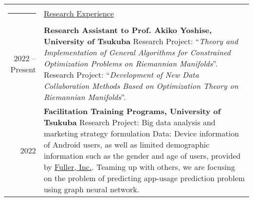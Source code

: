 \documentclass[letterpaper,11pt]{article}
\newcommand{\headingfont}{\LARGE \MakeUppercase }
\newenvironment{SectionTable}[1]{
	\renewcommand*{\arraystretch}{1.0}
	\setlength{\tabcolsep}{10pt}
	\begin{longtable}{Rp{5.2in}} 
		\rule{2.5cm}{4pt} 
		& \underline{#1} \\ %
	}
	{
	\end{longtable}\vspace{-.3cm}
}
\begin{document}
%	
%	
%	
%	
%	



\begin{SectionTable}{\headingfont Research Experience}
	2022 -- Present & 
	\textbf{Research Assistant to Prof. Akiko Yoshise, University of Tsukuba} \newline
	Research Project: ``\textit{Theory and Implementation of General Algorithms for Constrained Optimization Problems on Riemannian Manifolds}''. \newline
	Research Project: ``\textit{Development of New Data Collaboration Methods Based on Optimization Theory on Riemannian Manifolds}''. \\
	
	2022 &
	\textbf{Facilitation Training Programs, University of Tsukuba}
	\newline
	Research Project: Big data analysis and marketing strategy formulation
	\newline
	Data: Device information of Android users, as well as limited demographic information such as the gender and age of users, provided by \href{https://en.fuller-inc.com/}{Fuller, Inc.}. \newline
	Teaming up with others, we are focusing on the problem of predicting app-usage prediction problem using graph neural network.
\end{SectionTable}
\end{document}
